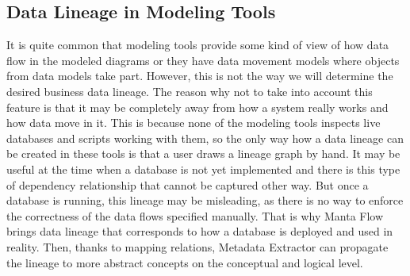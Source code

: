 \subsection{Data Lineage in Modeling Tools}

It is quite common that modeling tools provide some kind of view of how data flow in the modeled diagrams or they have data movement models where objects from data models take part. 
However, this is not the way we will determine the desired business data lineage.
The reason why not to take into account this feature is that it may be completely away from how a system really works and how data move in it. 
This is because none of the modeling tools inspects live databases and scripts working with them, so the only way how a data lineage can be created in these tools is that a user draws a lineage graph by hand.
It may be useful at the time when a database is not yet implemented and there is this type of dependency relationship that cannot be captured other way. But once a database is running, this lineage may be misleading, as there is no way to enforce the correctness of the data flows specified manually.
That is why Manta Flow brings data lineage that corresponds to how a database is deployed and used in reality. Then, thanks to mapping relations, Metadata Extractor can propagate the lineage to more abstract concepts on the conceptual and logical level.